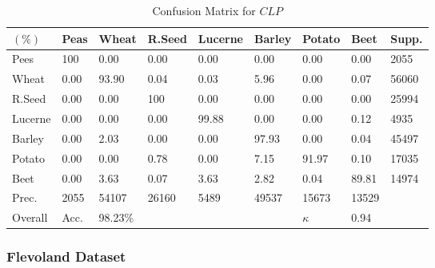 \begin{table}[tbp]
	\centering
	\caption{Confusion Matrix for $CLP$}
	\label{tab:cmCLP}
	\begin{tabularx}{\columnwidth}{XXXXXXXX|X}
		\hline \noalign{\vskip 0.5mm} 
		$(\%)$   & Peas & Wheat      & R.Seed   & Lucerne      & Barley     & Potato   & Beet & Supp.     \\ \hline \noalign{\vskip 0.3mm} 
		Pees     & 100 & 0.00  & 0.00     & 0.00   & 0.00   & 0.00   & 0.00 & 2055 \\
		Wheat    & 0.00   & 93.90 & 0.04     & 0.03   & 5.96   & 0.00   & 0.07 & 56060 \\
		R.Seed   & 0.00   & 0.00  & 100   & 0.00   & 0.00   & 0.00   & 0.00 & 25994 \\
		Lucerne  & 0.00   & 0.00  & 0.00     & 99.88  & 0.00   & 0.00   & 0.12 & 4935 \\
		Barley   & 0.00   & 2.03  & 0.00     & 0.00   & 97.93  & 0.00   & 0.04 & 45497 \\
		Potato   & 0.00   & 0.00  & 0.78     & 0.00   & 7.15   & 91.97  & 0.10 & 17035 \\
		Beet     & 0.00   & 3.63  & 0.07     & 3.63   & 2.82   & 0.04   & 89.81 & 14974 \\ \hline  %
		Prec.  & 2055   & 54107 &   26160     &   5489    &  49537      &15673  & 13529 &  \\ %
		Overall  & Acc.   & 98.23\% &        &       &        &$\kappa$   & 0.94 &  \\ \hline
	\end{tabularx}
\end{table}









\subsubsection{Flevoland Dataset}



